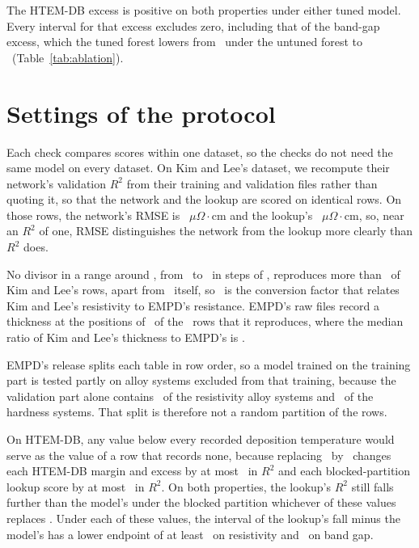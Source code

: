 \documentclass[11pt]{article}
\begin{document}
The HTEM-DB excess is positive on both properties under either tuned model.
Every interval for that excess excludes zero, including that of the band-gap
excess, which the tuned forest lowers from \htemGapExcess\ under the untuned
forest to \htemGapExcessTuned\ (Table~\ref{tab:ablation}).

\begin{table}[htbp] \small \caption{Three models' scores under the HTEM-DB
random and blocked partitions, on the main text's rows and folds. Bracketed ranges are
\bootstrapLevel\% percentile bootstrap intervals over \bootstrapReplicates\
resamples of whole libraries.}
\label{tab:ablation}  \end{table}

\section{Settings of the protocol}
\label{sec:esi-settings}

Each check compares scores within one dataset, so the checks do not need the
same model on every dataset. On Kim and Lee's dataset, we recompute their network's validation $R^2$ from their training and
validation files rather than quoting it, so that the network and the lookup are
scored on identical rows. On
those rows, the network's RMSE is \npjModelRmse~$\mu\Omega\cdot$cm and the
lookup's \npjLookupRmse~$\mu\Omega\cdot$cm, so, near an $R^2$ of one, RMSE
distinguishes the network from the lookup more clearly than $R^2$ does.

No divisor in a range around \npjSharedFactor, from \npjFactorGridLow\ to
\npjFactorGridHigh\ in steps of \npjFactorGridStep, reproduces more than
\npjSharedOtherRows\ of Kim and Lee's rows, apart from \npjSharedFactor\ itself,
so \npjSharedFactor\ is the conversion factor that relates Kim and Lee's
resistivity to EMPD's resistance. EMPD's raw files record a thickness at the
positions of \npjSharedThicknessRows\ of the \npjSharedRows\ rows that it
reproduces, where the median ratio of Kim and Lee's thickness to EMPD's is
\npjSharedThicknessRatio.

EMPD's release splits each table in row order, so a model trained on the
training part is tested partly on alloy systems excluded from that training,
because the validation part alone contains \empdResValidationOnlySystems\ of the
resistivity alloy systems and \empdHardValidationOnlySystems\ of the hardness
systems. That split is therefore not a random partition of the rows.

On HTEM-DB, any value below every recorded deposition temperature would serve
as the value of a row that records none, because replacing \htemNoTemperature\ by
\htemNoTemperatureAlternatives\ changes each HTEM-DB margin and excess by at most
\htemNoTemperatureShift\ in $R^2$ and each blocked-partition lookup score by at
most \htemNoTemperatureLookupShift\ in $R^2$. On both properties, the lookup's
$R^2$ still falls further than the model's under the blocked partition whichever
of these values replaces \htemNoTemperature. Under each of these values, the
interval of the lookup's fall minus the model's has a lower endpoint of at least
\htemResFillFallLo\ on resistivity and \htemGapFillFallLo\ on band gap.
\end{document}
